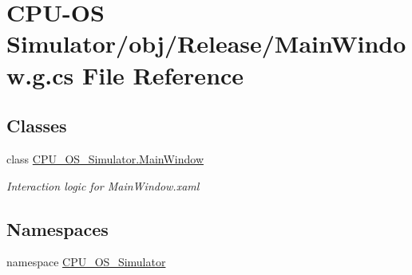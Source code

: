 \hypertarget{_c_p_u-_o_s_01_simulator_2obj_2_release_2_main_window_8g_8cs}{}\section{C\+P\+U-\/\+O\+S Simulator/obj/\+Release/\+Main\+Window.g.\+cs File Reference}
\label{_c_p_u-_o_s_01_simulator_2obj_2_release_2_main_window_8g_8cs}
\subsection*{Classes}
\begin{DoxyCompactItemize}
\item 
class \hyperlink{class_c_p_u___o_s___simulator_1_1_main_window}{C\+P\+U\+\_\+\+O\+S\+\_\+\+Simulator.\+Main\+Window}
\begin{DoxyCompactList}\small\item\em Interaction logic for Main\+Window.\+xaml \end{DoxyCompactList}\end{DoxyCompactItemize}
\subsection*{Namespaces}
\begin{DoxyCompactItemize}
\item 
namespace \hyperlink{namespace_c_p_u___o_s___simulator}{C\+P\+U\+\_\+\+O\+S\+\_\+\+Simulator}
\end{DoxyCompactItemize}
